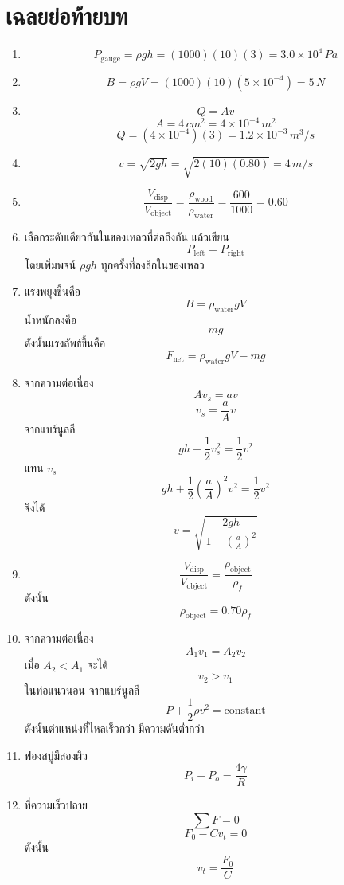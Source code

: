 \section{เฉลยย่อท้ายบท}

\begin{enumerate}
    \item
    \[
    P_{\text{gauge}}=\rho gh=(1000)(10)(3)=3.0\times10^4\,\si{Pa}
    \]

    \item
    \[
    B=\rho gV=(1000)(10)(5\times10^{-4})=5\,\si{N}
    \]

    \item
    \[
    Q=Av
    \]
    \[
    A=4\,\si{cm^2}=4\times10^{-4}\,\si{m^2}
    \]
    \[
    Q=(4\times10^{-4})(3)=1.2\times10^{-3}\,\si{m^3/s}
    \]

    \item
    \[
    v=\sqrt{2gh}=\sqrt{2(10)(0.80)}=4\,\si{m/s}
    \]

    \item
    \[
    \frac{V_{\text{disp}}}{V_{\text{object}}}
    =
    \frac{\rho_{\text{wood}}}{\rho_{\text{water}}}
    =
    \frac{600}{1000}=0.60
    \]

    \item
    เลือกระดับเดียวกันในของเหลวที่ต่อถึงกัน แล้วเขียน
    \[
    P_{\text{left}}=P_{\text{right}}
    \]
    โดยเพิ่มพจน์ $\rho gh$ ทุกครั้งที่ลงลึกในของเหลว

    \item
    แรงพยุงขึ้นคือ
    \[
    B=\rho_{\text{water}}gV
    \]
    น้ำหนักลงคือ
    \[
    mg
    \]
    ดังนั้นแรงลัพธ์ขึ้นคือ
    \[
    F_{\text{net}}=\rho_{\text{water}}gV-mg
    \]

    \item
    จากความต่อเนื่อง
    \[
    Av_s=av
    \]
    \[
    v_s=\frac{a}{A}v
    \]
    จากแบร์นูลลี
    \[
    gh+\frac{1}{2}v_s^2=\frac{1}{2}v^2
    \]
    แทน $v_s$
    \[
    gh+\frac{1}{2}\left(\frac{a}{A}\right)^2v^2=\frac{1}{2}v^2
    \]
    จึงได้
    \[
    v=
    \sqrt{
    \frac{2gh}{1-\left(\frac{a}{A}\right)^2}
    }
    \]

    \item
    \[
    \frac{V_{\text{disp}}}{V_{\text{object}}}
    =
    \frac{\rho_{\text{object}}}{\rho_f}
    \]
    ดังนั้น
    \[
    \rho_{\text{object}}=0.70\rho_f
    \]

    \item
    จากความต่อเนื่อง
    \[
    A_1v_1=A_2v_2
    \]
    เมื่อ $A_2<A_1$ จะได้
    \[
    v_2>v_1
    \]
    ในท่อแนวนอน จากแบร์นูลลี
    \[
    P+\frac{1}{2}\rho v^2=\text{constant}
    \]
    ดังนั้นตำแหน่งที่ไหลเร็วกว่า มีความดันต่ำกว่า

    \item
    ฟองสบู่มีสองผิว
    \[
    P_i-P_o=\frac{4\gamma}{R}
    \]

    \item
    ที่ความเร็วปลาย
    \[
    \sum F=0
    \]
    \[
    F_0-Cv_t=0
    \]
    ดังนั้น
    \[
    v_t=\frac{F_0}{C}
    \]
\end{enumerate}

